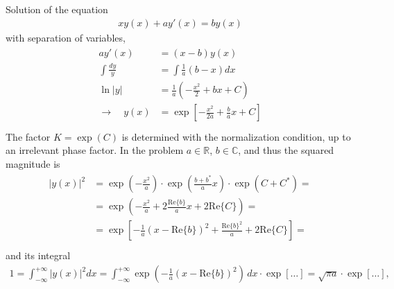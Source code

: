 \documentclass[letterpaper,10pt,english]{jupyterBook}
\begin{document}
\sphinxAtStartPar
Solution of the equation
\begin{equation*}
\begin{split} x y(x) + a y'(x) = b y(x) \end{split}
\end{equation*}
\sphinxAtStartPar
with separation of variables,
\begin{equation*}
\begin{split}\begin{aligned}
  a y'(x) & = ( x - b ) y(x) \\
  \int \frac{dy}{y} & = \int \frac{1}{a} \left( b - x \right) dx \\
  \ln |y| & = \frac{1}{a} \left( - \frac{x^2}{2} + b x + C \right) \\
  \rightarrow \quad y(x) & = \exp \left[ - \frac{x^2}{2 a} + \frac{b}{a} x + C \right] \\
\end{aligned}\end{split}
\end{equation*}
\sphinxAtStartPar
The factor \(K = \exp(C)\) is determined with the normalization condition, up to an irrelevant phase factor. In the problem \(a \in \mathbb{R}\), \(b \in \mathbb{C}\), and thus the squared magnitude is
\begin{equation*}
\begin{split}\begin{aligned}
  |y(x)|^2 
  & = \exp\left(-\frac{x^2}{a}\right) \cdot \exp\left( \frac{b + b^*}{a} x\right) \cdot \exp\left( C + C^*\right) = \\
  & = \exp\left(-\frac{x^2}{a} + 2 \frac{\text{Re}\{ b \}}{a} x + 2 \text{Re}\{ C \} \right) = \\
  & = \exp\left[ - \frac{1}{a} \left( x - \text{Re}\{ b \} \right)^2 + \frac{\text{Re}\{ b \}^2}{a} + 2 \text{Re}\{ C \} \right] = \\
\end{aligned}\end{split}
\end{equation*}
\sphinxAtStartPar
and its integral
\begin{equation*}
\begin{split}1 = \int_{-\infty}^{+\infty} |y(x)|^2 dx = \int_{-\infty}^{+\infty} \exp\left( - \frac{1}{a} \left( x - \text{Re}\{ b \} \right)^2 \right) \, dx \cdot \exp \left[ \dots \right] = \sqrt{\pi a} \cdot \exp [ \dots ] ,\end{split}
\end{equation*}
\sphinxAtStartPar
\end{document}
